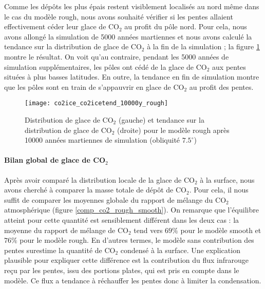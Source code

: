 \documentclass[11pt,a4paper]{article}
\begin{document}
Comme les dépôts les plus épais restent visiblement localisés au nord même dans le cas du modèle rough, nous avons souhaité vérifier si les pentes allaient effectivement céder leur glace de CO$_2$ au profit du pôle nord. Pour cela, nous avons allongé la simulation de 5000 années martiennes et nous avons calculé la tendance sur la distribution de glace de CO$_2$ à la fin de la simulation ; la figure \ref{co2ice_co2icetend_10000y_rough} montre le résultat. On voit qu'au contraire, pendant les 5000 années de simulation supplémentaires, les pôles ont cédé de la glace de CO$_2$ aux pentes situées à plus basses latitudes. En outre, la tendance en fin de simulation montre que les pôles sont en train de s'appauvrir en glace de CO$_2$ au profit des pentes. \\

\begin{figure}[h!]
\begin{center}
\texttt{[image: co2ice\_co2icetend\_10000y\_rough]}
\caption{Distribution de glace de CO$_2$ (gauche) et tendance sur la distribution de glace de CO$_2$ (droite) pour le modèle rough après 10000 années martiennes de simulation (obliquité $7.5^\circ$)}
\label{co2ice_co2icetend_10000y_rough}
\end{center}
\end{figure}

\paragraph{Bilan global de glace de CO$_2$ \\}
Après avoir comparé la distribution locale de la glace de CO$_2$ à la surface, nous avons cherché à comparer la masse totale de dépôt de CO$_2$. Pour cela, il nous suffit de comparer les moyennes globale du rapport de mélange du CO$_2$ atmosphérique (figure \ref{comp_co2_rough_smooth}). On remarque que l'équilibre atteint pour cette quantité est sensiblement différent dans les deux cas : la moyenne du rapport de mélange de CO$_2$ tend vers $69\%$ pour le modèle smooth et $76\%$ pour le modèle rough. En d'autres termes, le modèle sans contribution des pentes surestime la quantité de CO$_2$ condensé à la surface. Une explication plausible pour expliquer cette différence est la contribution du flux infrarouge reçu par les pentes, issu des portions plates, qui est pris en compte dans le modèle. Ce flux a tendance à réchauffer les pentes donc à limiter la condensation. \\
\end{document}
